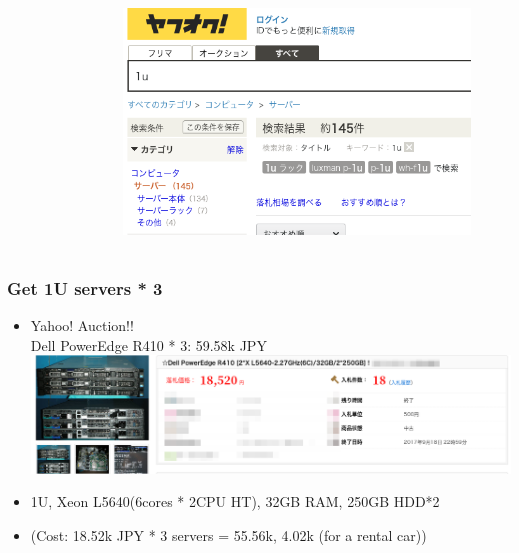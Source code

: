 \documentclass[aspectratio=169,11pt,hyperref={colorlinks=true}]{beamer}
\begin{document}
\begin{frame}
\begin{columns}[T]
\begin{column}{0.45\textwidth}
\begin{figure}
\begin{center}
        \end{center}
      \end{figure}
    \end{column}
    \begin{column}{0.45\textwidth}
      \begin{figure}
        \begin{center}
          \includegraphics[width=1.0\textwidth]{yahoo_auction_1u_large.png}
        \end{center}
      \end{figure}
    \end{column}
  \end{columns}
\end{frame}

\begin{frame}
  \frametitle{Get 1U servers * 3}
  \begin{itemize}
    \item Yahoo! Auction!! \\
      Dell PowerEdge R410 * 3: 59.58k JPY\\
      \includegraphics[scale=1.0]{auction_r410.png}\\
    \item[] 1U, Xeon L5640(6cores * 2CPU HT), 32GB RAM, 250GB HDD*2
    \item[] (Cost: 18.52k JPY * 3 servers = 55.56k, 4.02k (for a rental car))
  \end{itemize}
\end{frame}
\end{document}
